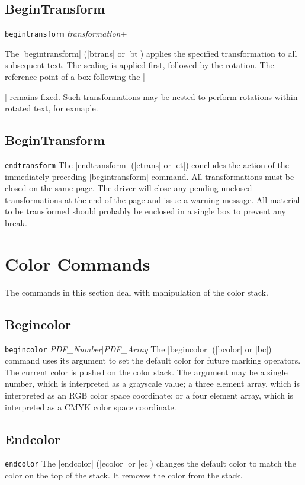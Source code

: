 {{\subsection{BeginTransform}
\syntax
{\tt begintransform} {\it transformation}+

\description
The |begintransform| (|btrans| or |bt|) applies
the specified transformation to all subsequent text.
The scaling is applied first, followed by the rotation.
The reference point of a box following
the |\special| remains fixed.  Such transformations
may be nested to perform rotations within rotated text, for exmaple.

\example
\begintt
{}
\endtt

\subsection{BeginTransform}
\syntax
{\tt endtransform}
\description
The |endtransform| (|etrans| or |et|) concludes
the action of the immediately preceding |begintransform|
command.  All transformations must be closed
on the same page.  The driver will close
any pending unclosed transformations at the
end of the page and issue a warning message.
All material to be transformed
should probably be enclosed in a single box
to prevent any break.
\example
\begintt
{}
\endtt


\section{Color Commands}
The commands in this section deal with manipulation of the color
stack.

\subsection{Begincolor}
\syntax
{\tt begincolor} {\it PDF\_Number$\vert$\it PDF\_Array}
\description
The |begincolor| (|bcolor| or |bc|) command uses its
argument to set the default color for future marking operators.
The current color is pushed on the color stack.  The argument
may be a single number, which is interpreted as a grayscale
value; a three element array, which is interpreted as an RGB
color space coordinate; or a four element array, which
is interpreted as a CMYK color space coordinate.
\example
\begintt
{}
\endtt

\subsection{Endcolor}
\syntax
{\tt endcolor}
\description
The |endcolor| (|ecolor| or |ec|)
changes the default color to
match the color on the top
of the stack.  It removes
the color from the stack.
\example
\begintt
{}
\endtt

}}

